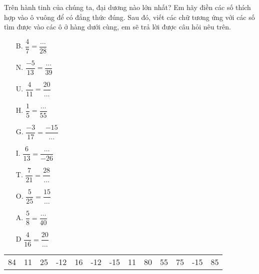 \begin{bt}
Trên hành tinh của chúng ta, đại dương nào lớn nhất? Em hãy điền các số thích hợp vào ô vuông để có đẳng thức đúng. Sau đó, viết các chữ tương ứng với các số tìm được vào các ô ở hàng dưới cùng, em sẽ trả lời được câu hỏi nêu trên.
	\begin{multicols}{2}
	\begin{enumerate}
	\item[B.] $\dfrac{4}{7} = \dfrac{\ldots}{28}$
	\item[N.] $\dfrac{-5}{13} = \dfrac{\ldots}{39}$
	\item[U.] $\dfrac{4}{11} = \dfrac{20}{\ldots}$
	\item[H.] $\dfrac{1}{5} = \dfrac{\ldots}{55}$
	\item[G.] $\dfrac{-3}{17} =\dfrac{-15}{\ldots}$
	\item[I.] $\dfrac{6}{13} = \dfrac{\ldots}{-26}$
	\item[T.] $\dfrac{7}{21} = \dfrac{28}{\ldots}$
	\item[O.] $\dfrac{5}{25} = \dfrac{15}{\ldots}$
	\item[A.] $\dfrac{5}{8} = \dfrac{\ldots}{40}$
	\item[D] $\dfrac{4}{16} =\dfrac{20}{\ldots}$
	\end{enumerate}
	\end{multicols}
\begin{tabular}{|c|c|c|c|c|c|c|c|c|c|c|c|c|}
\hline
 &  &  &  & & & & & & & & &  \\
\hline
{84} & {11}  & {25}  & {-12}  & {16}  & {-12}   & {-15}  & {11}   & {80}  & {55}   &{75} & {-15} & {85}\\
\hline
\end{tabular}
\end{bt}